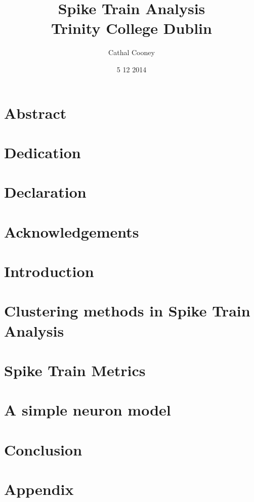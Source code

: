 \documentclass[12pt]{report}
\title{
	{Spike Train Analysis} \\
	{\large Trinity College Dublin} \\
}
\author{Cathal Cooney}
\date{5 12 2014}
\begin{document}
\maketitle

\chapter*{Abstract}

\chapter*{Dedication}

\chapter*{Declaration}

\chapter*{Acknowledgements}

\tableofcontents

\chapter{Introduction}


\chapter{Clustering methods in Spike Train Analysis}


\chapter{Spike Train Metrics}


\chapter{A simple neuron model}


\chapter{Conclusion}


\appendix
\chapter{Appendix}

\end{document}

